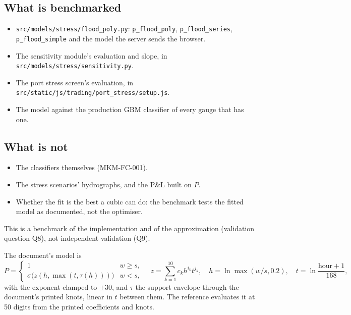 \documentclass[11pt,a4paper]{article}
\begin{document}
\mkmpurpose

\subsection{What is benchmarked}
\begin{itemize}[leftmargin=*,nosep]
\item \texttt{src/models/stress/flood\_poly.py}: \texttt{p\_flood\_poly},
  \texttt{p\_flood\_series}, \texttt{p\_flood\_simple} and the model the server sends
  the browser.
\item The sensitivity module's evaluation and slope, in
  \texttt{src/models/stress/sensitivity.py}.
\item The port stress screen's evaluation, in
  \texttt{src/static/js/trading/port\_stress/setup.js}.
\item The model against the production GBM classifier of every gauge that has one.
\end{itemize}

\subsection{What is not}
\begin{itemize}[leftmargin=*,nosep]
\item The classifiers themselves (MKM-FC-001).
\item The stress scenarios' hydrographs, and the P\&L built on $P$.
\item Whether the fit is the best a cubic can do: the benchmark tests the fitted model
  as documented, not the optimiser.
\end{itemize}
This is a benchmark of the implementation and of the approximation (validation question
Q8), not independent validation (Q9).

\mkmframework

The document's model is
\begin{equation}
P=\begin{cases}1 & w\ge s,\\ \sigma\big(z(h,\max(t,\tau(h)))\big) & w<s,\end{cases}
\quad z=\sum_{k=1}^{10}c_k h^{i_k}t^{j_k},\quad h=\ln\max(w/s,0.2),\quad
t=\ln\frac{\text{hour}+1}{168},
\end{equation}
with the exponent clamped to $\pm30$, and $\tau$ the support envelope through the
document's printed knots, linear in $t$ between them. The reference evaluates it at 50
digits from the printed coefficients and knots.
\end{document}
